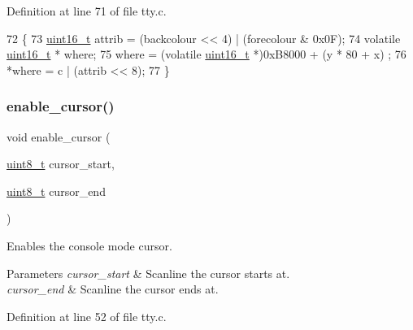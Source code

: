 Definition at line 71 of file tty.\+c.


\begin{DoxyCode}
72 \{
73      \hyperlink{a00134_a273cf69d639a59973b6019625df33e30_a273cf69d639a59973b6019625df33e30}{uint16\_t} attrib = (backcolour << 4) | (forecolour & 0x0F);
74      \textcolor{keyword}{volatile} \hyperlink{a00134_a273cf69d639a59973b6019625df33e30_a273cf69d639a59973b6019625df33e30}{uint16\_t} * where;
75      where = (\textcolor{keyword}{volatile} \hyperlink{a00134_a273cf69d639a59973b6019625df33e30_a273cf69d639a59973b6019625df33e30}{uint16\_t} *)0xB8000 + (y * 80 + x) ;
76      *where = c | (attrib << 8);
77 \}
\end{DoxyCode}
\mbox{\label{a00176_afe197dc4dbfa6036ef04abd2aeeeca2d_afe197dc4dbfa6036ef04abd2aeeeca2d}} 
\subsubsection{\texorpdfstring{enable\+\_\+cursor()}{enable\_cursor()}}
{\footnotesize\ttfamily void enable\+\_\+cursor (\begin{DoxyParamCaption}\item[{\hyperlink{a00134_aba7bc1797add20fe3efdf37ced1182c5_aba7bc1797add20fe3efdf37ced1182c5}{uint8\+\_\+t}}]{cursor\+\_\+start,  }\item[{\hyperlink{a00134_aba7bc1797add20fe3efdf37ced1182c5_aba7bc1797add20fe3efdf37ced1182c5}{uint8\+\_\+t}}]{cursor\+\_\+end }\end{DoxyParamCaption})}



Enables the console mode cursor. 


\begin{DoxyParams}{Parameters}
{\em cursor\+\_\+start} & Scanline the cursor starts at. \\
\hline
{\em cursor\+\_\+end} & Scanline the cursor ends at. \\
\hline
\end{DoxyParams}


Definition at line 52 of file tty.\+c.


